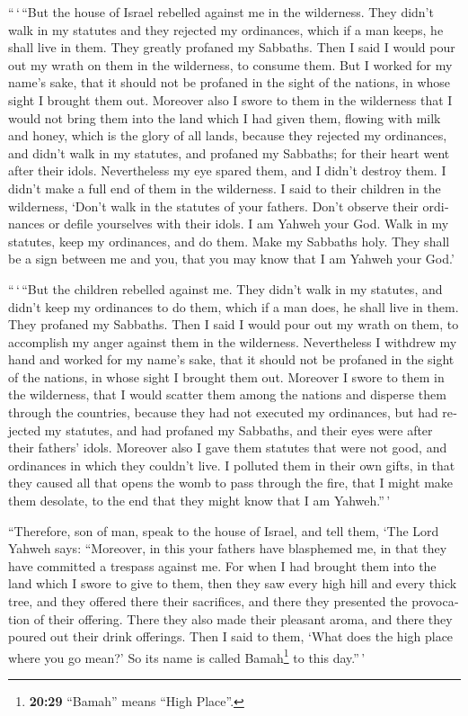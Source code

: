 \begin{paracol}{2}
\begin{otherlanguage}{english}
 ``\,`\,``But the house of Israel rebelled against me in
the wilderness. They didn't walk in my statutes and they rejected my
ordinances, which if a man keeps, he shall live in them. They greatly
profaned my Sabbaths. Then I said I would pour out my wrath on them in
the wilderness, to consume them.  But I worked for my
name's sake, that it should not be profaned in the sight of the nations,
in whose sight I brought them out.  Moreover also I swore
to them in the wilderness that I would not bring them into the land
which I had given them, flowing with milk and honey, which is the glory
of all lands,  because they rejected my ordinances, and
didn't walk in my statutes, and profaned my Sabbaths; for their heart
went after their idols.  Nevertheless my eye spared them,
and I didn't destroy them. I didn't make a full end of them in the
wilderness.  I said to their children in the wilderness,
`Don't walk in the statutes of your fathers. Don't observe their
ordinances or defile yourselves with their idols.  I am
Yahweh your God. Walk in my statutes, keep my ordinances, and do them.
 Make my Sabbaths holy. They shall be a sign between me
and you, that you may know that I am Yahweh your God.'

 ``\,`\,``But the children rebelled against me. They
didn't walk in my statutes, and didn't keep my ordinances to do them,
which if a man does, he shall live in them. They profaned my Sabbaths.
Then I said I would pour out my wrath on them, to accomplish my anger
against them in the wilderness.  Nevertheless I withdrew
my hand and worked for my name's sake, that it should not be profaned in
the sight of the nations, in whose sight I brought them out.
 Moreover I swore to them in the wilderness, that I would
scatter them among the nations and disperse them through the countries,
 because they had not executed my ordinances, but had
rejected my statutes, and had profaned my Sabbaths, and their eyes were
after their fathers' idols.  Moreover also I gave them
statutes that were not good, and ordinances in which they couldn't live.
 I polluted them in their own gifts, in that they caused
all that opens the womb to pass through the fire, that I might make them
desolate, to the end that they might know that I am Yahweh.''\,'

 ``Therefore, son of man, speak to the house of Israel,
and tell them, `The Lord Yahweh says: ``Moreover, in this your fathers
have blasphemed me, in that they have committed a trespass against me.
 For when I had brought them into the land which I swore
to give to them, then they saw every high hill and every thick tree, and
they offered there their sacrifices, and there they presented the
provocation of their offering. There they also made their pleasant
aroma, and there they poured out their drink offerings. 
Then I said to them, `What does the high place where you go mean?' So
its name is called Bamah\footnote{\textbf{20:29} ``Bamah'' means ``High
  Place''.} to this day.''\,'


\end{otherlanguage}
\end{paracol}
